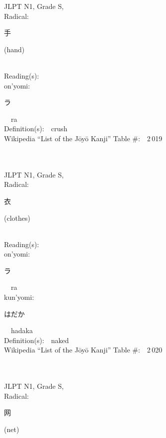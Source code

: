 \begin{multicols}{2}
{JLPT N1, Grade S, \\Radical:\ \ {\begin{CJK}{UTF8}{min} 手 \end{CJK}} (hand) } \\
Reading(s):\ \ \\
{\hspace*{1em}}on'yomi:\ \ \\
{\hspace*{2em}}{\begin{CJK}{UTF8}{min} ラ \end{CJK}}\ \ ra\ \ \\
Definition(s):\ \ crush \\
Wikipedia ``List of the J\=oy\=o Kanji'' Table \#:\ \ 2\,019 \\
\ \ \\
{\fontsize{34pt}{40pt}  }\ \ \\
{JLPT N1, Grade S, \\Radical:\ \ {\begin{CJK}{UTF8}{min} 衣 \end{CJK}} (clothes) } \\
Reading(s):\ \ \\
{\hspace*{1em}}on'yomi:\ \ \\
{\hspace*{2em}}{\begin{CJK}{UTF8}{min} ラ \end{CJK}}\ \ ra\ \ \\
{\hspace*{1em}}kun'yomi:\ \ \\
{\hspace*{2em}}{\begin{CJK}{UTF8}{min} はだか \end{CJK}}\ \ hadaka\ \ \\
Definition(s):\ \ naked \\
Wikipedia ``List of the J\=oy\=o Kanji'' Table \#:\ \ 2\,020 \\
\ \ \\
{\fontsize{34pt}{40pt}  }\ \ \\
{JLPT N1, Grade S, \\Radical:\ \ {\begin{CJK}{UTF8}{min} 网 \end{CJK}} (net) } \\

\end{multicols}
